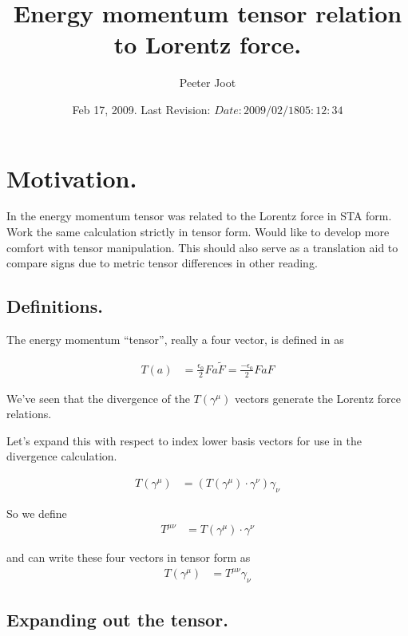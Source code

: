 \documentclass{article}
\title{ Energy momentum tensor relation to Lorentz force. }
\author{Peeter Joot}
\date{ Feb 17, 2009.  Last Revision: $Date: 2009/02/18 05:12:34 $ }
\begin{document}
\maketitle{}

\section{ Motivation. }

In \cite{PJstressEnergyLorentz} the energy momentum tensor was related
to the Lorentz force in STA form.  Work the same calculation strictly in
tensor form.  Would like to %
develop more comfort with tensor manipulation.  This should also serve
as a translation aid to compare signs due to metric tensor differences 
in other reading.

\subsection{ Definitions. }

The energy momentum ``tensor'', really a four vector, is defined
in \cite{doran2003gap}
as

\begin{align}
T(a) &= 
\frac{\epsilon_0}{2} F a \tilde{F} = \frac{-\epsilon_0}{2} F a {F} 
\end{align}

We've seen that the divergence of the $T(\gamma^\mu)$ vectors generate
the Lorentz force relations.

Let's expand this with respect to index lower basis vectors for use in the
divergence calculation.

\begin{align}
T(\gamma^\mu) &= (T(\gamma^\mu) \cdot \gamma^\nu) \gamma_\nu 
\end{align}

So we define
\begin{align}
T^{\mu \nu} 
&= T(\gamma^\mu) \cdot \gamma^\nu
\end{align}

and can write these four vectors in tensor form as
\begin{align}
T(\gamma^\mu) &= T^{\mu \nu} \gamma_\nu 
\end{align}

\subsection{ Expanding out the tensor. }
\end{document}
